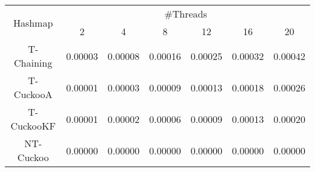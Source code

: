 \begin{tabular}{|c|c|c|c|c|c|c|}
\hline
\multirow{2}{*}{Hashmap} & \multicolumn{6}{c|}{\#Threads}\\\cline{2-7}& 2 & 4 & 8 & 12 & 16 & 20\\
\hline
\hline
T-Chaining & 0.00003 & 0.00008 & 0.00016 & 0.00025 & 0.00032 & 0.00042\\
T-CuckooA & 0.00001 & 0.00003 & 0.00009 & 0.00013 & 0.00018 & 0.00026\\
T-CuckooKF & 0.00001 & 0.00002 & 0.00006 & 0.00009 & 0.00013 & 0.00020\\
NT-Cuckoo & 0.00000 & 0.00000 & 0.00000 & 0.00000 & 0.00000 & 0.00000\\
\hline
\end{tabular}
